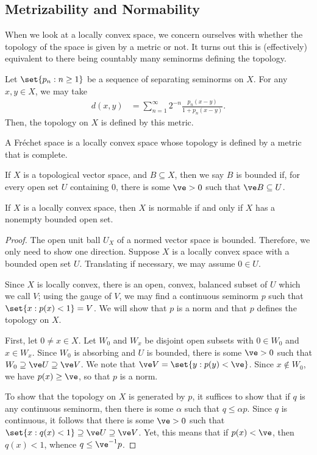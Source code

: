 \documentclass[10pt]{mypackage}
\begin{document}
\subsection{Metrizability and Normability}%
When we look at a locally convex space, we concern ourselves with whether the topology of the space is given by a metric or not. It turns out this is (effectively) equivalent to there being countably many seminorms defining the topology.
\begin{proposition}
  Let $\set{p_n : n\geq 1}$ be a sequence of separating seminorms on $X$. For any $x,y\in X$, we may take
  \begin{align*}
    d\left( x,y \right) &= \sum_{n=1}^{\infty} 2^{-n} \frac{p_n\left( x-y \right)}{1 + p_n\left( x-y \right)}.
  \end{align*}
  Then, the topology on $X$ is defined by this metric.
\end{proposition}
\begin{definition}
  A Fréchet space is a locally convex space whose topology is defined by a metric that is complete.
\end{definition}
\begin{definition}
  If $X$ is a topological vector space, and $B\subseteq X$, then we say $B$ is bounded if, for every open set $U$ containing $0$, there is some $\ve > 0$ such that $\ve B \subseteq U$.
\end{definition}
\begin{proposition}
  If $X$ is a locally convex space, then $X$ is normable if and only if $X$ has a nonempty bounded open set.
\end{proposition}
\begin{proof}
  The open unit ball $U_X$ of a normed vector space is bounded. Therefore, we only need to show one direction. Suppose $X$ is a locally convex space with a bounded open set $U$. Translating if necessary, we may assume $0\in U$.

  Since $X$ is locally convex, there is an open, convex, balanced subset of $U$ which we call $V$; using the gauge of $V$, we may find a continuous seminorm $p$ such that $\set{x : p(x) < 1} = V$. We will show that $p$ is a norm and that $p$ defines the topology on $X$.

  First, let $0\neq x\in X$. Let $W_0$ and $W_x$ be disjoint open subsets with $0\in W_0$ and $x\in W_x$. Since $W_0$ is absorbing and $U$ is bounded, there is some $\ve > 0$ such that $W_0\supseteq \ve U \supseteq \ve V$. We note that $\ve V = \set{y : p(y) < \ve}$. Since $x\notin W_0$, we have $p(x)\geq \ve$, so that $p$ is a norm.

  To show that the topology on $X$ is generated by $p$, it suffices to show that if $q$ is any continuous seminorm, then there is some $\alpha$ such that $q\leq \alpha p$. Since $q$ is continuous, it follows that there is some $\ve > 0$ such that $\set{x : q(x) < 1}\supseteq \ve U \supseteq \ve V$. Yet, this means that if $p(x) < \ve$, then $q(x) < 1$, whence $q\leq \ve^{-1}p$.
\end{proof}
\end{document}
